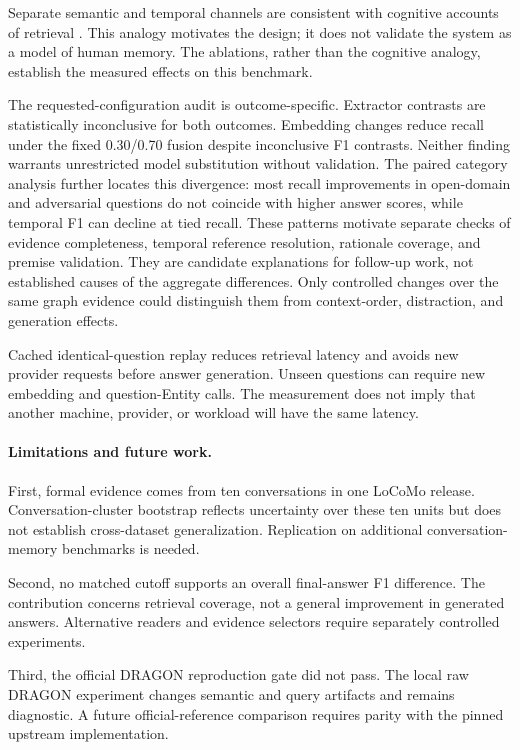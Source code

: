 \documentclass[a4paper,twoside]{article}
\begin{document}
Separate semantic and temporal channels are consistent with cognitive
accounts of retrieval \cite{collins1975spreading,kahana1996associative,howard2002temporal}.
This analogy motivates the design; it does not validate the system as a model
of human memory. The ablations, rather than the cognitive analogy, establish
the measured effects on this benchmark.

The requested-configuration audit is outcome-specific. Extractor contrasts
are statistically inconclusive for both outcomes. Embedding changes reduce
recall under the fixed 0.30/0.70 fusion despite inconclusive F1 contrasts.
Neither finding warrants unrestricted model substitution without validation.
The paired category analysis further locates this divergence: most recall
improvements in open-domain and adversarial questions do not coincide with
higher answer scores, while temporal F1 can decline at tied recall.
These patterns motivate separate checks of evidence completeness, temporal
reference resolution, rationale coverage, and premise validation. They are
candidate explanations for follow-up work, not established causes of the
aggregate differences. Only controlled changes over the same graph evidence
could distinguish them from context-order, distraction, and generation effects.

Cached identical-question replay reduces retrieval latency and avoids new
provider requests before answer generation. Unseen questions can require new
embedding and question-Entity calls. The measurement does not imply that
another machine, provider, or workload will have the same latency.

\paragraph{Limitations and future work.}

First, formal evidence comes from ten conversations in one LoCoMo release.
Conversation-cluster bootstrap reflects uncertainty over these ten units but
does not establish cross-dataset generalization. Replication on additional
conversation-memory benchmarks is needed.

Second, no matched cutoff supports an overall final-answer F1 difference. The
contribution concerns retrieval coverage, not a general improvement in
generated answers. Alternative readers and evidence selectors require
separately controlled experiments.

Third, the official DRAGON reproduction gate did not pass. The local raw
DRAGON experiment changes semantic and query artifacts and remains diagnostic.
A future official-reference comparison requires parity with the pinned
upstream implementation.
\end{document}
